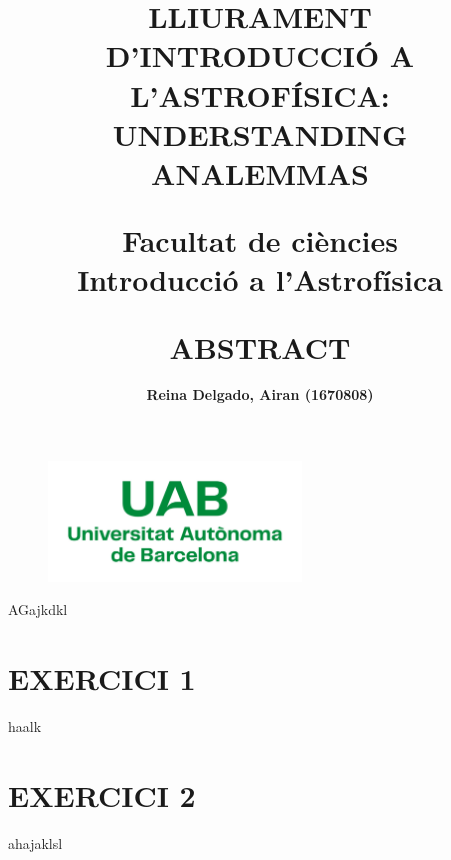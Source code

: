 \documentclass[a4paper, 11pt]{article}
\begin{document}
\begin{figure}
    \centering
    \includegraphics[width=0.6\textwidth]{images/Logo_uab.png}
    \label{uab}
\end{figure}

\title{{\textbf{\Large LLIURAMENT D'INTRODUCCIÓ A L'ASTROFÍSICA: UNDERSTANDING ANALEMMAS
}\\}

\vspace{12mm}

{\large Facultat de ciències}\\
{\large Introducció a l'Astrofísica}}

\author{\textbf{Reina Delgado, Airan (1670808)}}
\date{}


\maketitle

\vspace{30mm} \title{\textbf{\Large ABSTRACT}}



    \vspace{4mm} 
    \noindent AGajkdkl
    \newpage


\section*{EXERCICI 1}
\noindent haalk
\vspace{5mm}



\section*{EXERCICI 2}
\noindent ahajaklsl
\vspace{5mm}
\end{document}
